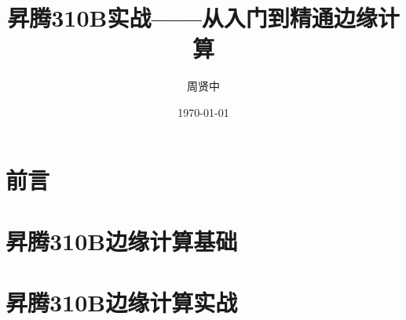 \documentclass[fontsize=12pt, paper=a4, twoside, openright, DIV=calc]{scrbook}
\title{昇腾310B实战——从入门到精通边缘计算}
\author{周贤中}
\date{\today}
\theoremstyle{break}
\begin{document}
\maketitle

\frontmatter
\chapter*{前言}



\tableofcontents

\mainmatter


\chapter{昇腾310B边缘计算基础}


\chapter{昇腾310B边缘计算实战}
% 







\end{document}
